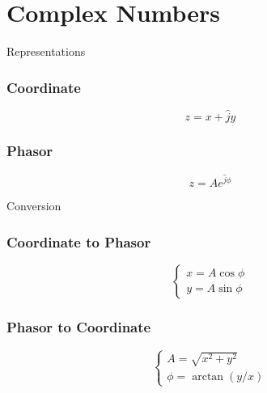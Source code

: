 \documentclass{../templates/topic}
\begin{document}
\chapter{Complex Numbers}

\begin{section}{Representations}
	
	\subsection{Coordinate}
		\begin{equation*}
			z=x+\hat{j}y
		\end{equation*}
	
	\subsection{Phasor}
		\begin{equation*}
			z=Ae^{\hat{j}\phi}
		\end{equation*}
		
\end{section}

\begin{section}{Conversion}
	
	\subsection{Coordinate to Phasor}
		\begin{equation*}
			\begin{cases}
				x = A\cos{\phi}\\
				y = A\sin{\phi}
			\end{cases}
		\end{equation*}
	
	\subsection{Phasor to Coordinate}
		\begin{equation*}
			\begin{cases}
				A = \sqrt{x^2+y^2}\\
				\phi = \arctan(y/x)
			\end{cases}
		\end{equation*}
	
\end{section}
\end{document}
